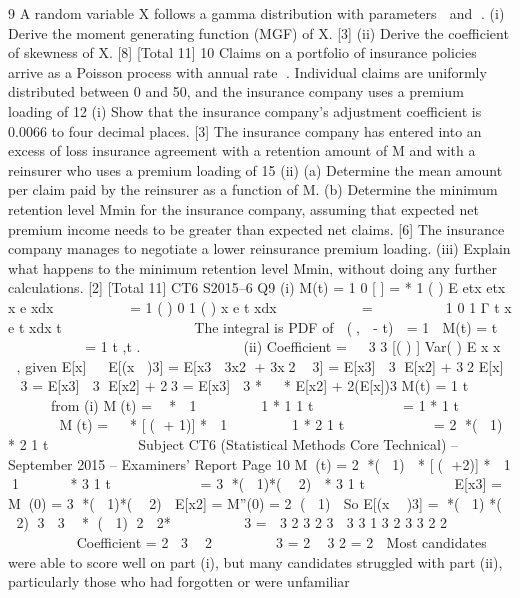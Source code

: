 
9 A random variable X follows a gamma distribution with parameters  and .
(i) Derive the moment generating function (MGF) of X. [3]
(ii) Derive the coefficient of skewness of X. [8]
[Total 11]
10 Claims on a portfolio of insurance policies arrive as a Poisson process with annual
rate . Individual claims are uniformly distributed between 0 and 50, and the
insurance company uses a premium loading of 12%
(i) Show that the insurance company’s adjustment coefficient is 0.0066 to four
decimal places. [3]
The insurance company has entered into an excess of loss insurance agreement with
a retention amount of M and with a reinsurer who uses a premium loading of 15%
(ii) (a) Determine the mean amount per claim paid by the reinsurer as a
function of M.
(b) Determine the minimum retention level Mmin for the insurance
company, assuming that expected net premium income needs to be
greater than expected net claims.
[6]
The insurance company manages to negotiate a lower reinsurance premium loading.
(iii) Explain what happens to the minimum retention level Mmin, without doing
any further calculations. [2]
[Total 11]
CT6 S2015–6
  Q9 (i) M(t) = 1
0
[ ] = * 1
( )
E etx etx x e xdx

  
  
= 1 ( )
0
1
( )
x e t xdx

   
  
=
          1
0
1
Γ
t x e t xdx
t
 
   


 
   
The integral is PDF of  (,  - t)  = 1
 M(t) =
  t
   
     
= 1 t ,t .
          
(ii) Coefficient =  
3
3
[( ) ]
Var( )
E x
x
  , given E[x]  
E[(x )3] = E[x3  3x2 + 3x2  3]
= E[x3]  3 E[x2] + 32 E[x]  3
= E[x3]  3 E[x2] + 23
= E[x3]  3 *
  

* E[x2] + 2(E[x])3
M(t) = 1 t         
from (i)
M(t) =  *  1


 

 
1
*
  1
1 t         
=
  1
* 1 t           
M(t) =
  

* [( + 1)] *  1


 

 
1
*
  2
1 t         
= 2
*( 1)

*
  2
1 t         
Subject CT6 (Statistical Methods Core Technical) – September 2015 – Examiners’ Report
Page 10
M(t) = 2
*( 1)

* [( +2)] *
   1 1     
*
  3
1 t         
= 3
*( 1)*(  2)

*
  3
1 t         
E[x3] = M(0) = 3
*( 1)*(  2)

E[x2] = M''(0) = 2
( 1)

So
E[(x  )3] = *( 1) *(  2)
3
 3

* ( 1)
2
 2* 


 

 
3
=  3 2 3 2 3 
3 3
1 3 2 3 3 2 2

           
 
Coefficient =
  2
3

2

 

 
3 = 2

3
2
= 2

Most candidates were able to score well on part (i), but many candidates
struggled with part (ii), particularly those who had forgotten or were unfamiliar
